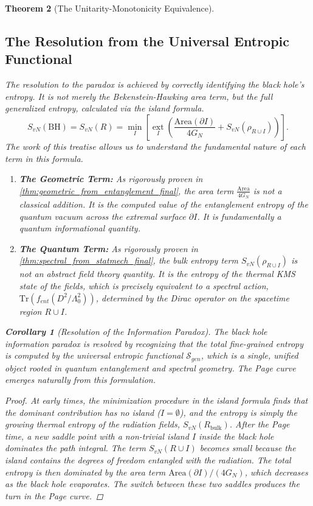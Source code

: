 \documentclass[11pt, letterpaper]{report}
\theoremstyle{plain} %
\newtheorem{theorem}{Theorem}[chapter]
\newtheorem{corollary}[theorem]{Corollary}
\theoremstyle{definition} %
\theoremstyle{remark} %
\begin{document}
\begin{theorem}[The Unitarity-Monotonicity Equivalence]
\subsection{The Resolution from the Universal Entropic Functional}
The resolution to the paradox is achieved by correctly identifying the black hole's entropy. It is not merely the Bekenstein-Hawking area term, but the full generalized entropy, calculated via the island formula.
\begin{equation}
    S_{vN}(\text{BH}) = S_{vN}(R) = \min_{I} \left[ \operatorname*{ext}_{I} \left( \frac{\text{Area}(\partial I)}{4G_N} + S_{vN}(\rho_{R \cup I}) \right) \right].
\end{equation}
The work of this treatise allows us to understand the fundamental nature of each term in this formula.
\begin{enumerate}
    \item \textbf{The Geometric Term:} As rigorously proven in \cref{thm:geometric_from_entanglement_final}, the area term $\frac{\text{Area}}{4G_N}$ is not a classical addition. It is the computed value of the entanglement entropy of the quantum vacuum across the extremal surface $\partial I$. It is fundamentally a quantum informational quantity.

    \item \textbf{The Quantum Term:} As rigorously proven in \cref{thm:spectral_from_statmech_final}, the bulk entropy term $S_{vN}(\rho_{R \cup I})$ is not an abstract field theory quantity. It is the entropy of the thermal KMS state of the fields, which is precisely equivalent to a spectral action, $\text{Tr}(f_{ent}(D^2/\Lambda_0^2))$, determined by the Dirac operator on the spacetime region $R \cup I$.
\end{enumerate}

\begin{corollary}[Resolution of the Information Paradox]
The black hole information paradox is resolved by recognizing that the total fine-grained entropy is computed by the universal entropic functional $\mathcal{S}_{gen}$, which is a single, unified object rooted in quantum entanglement and spectral geometry. The Page curve emerges naturally from this formulation.
\end{corollary}
\begin{proof}
At early times, the minimization procedure in the island formula finds that the dominant contribution has no island ($I=\emptyset$), and the entropy is simply the growing thermal entropy of the radiation fields, $S_{vN}(R_{\text{bulk}})$. After the Page time, a new saddle point with a non-trivial island $I$ inside the black hole dominates the path integral. The term $S_{vN}(R \cup I)$ becomes small because the island contains the degrees of freedom entangled with the radiation. The total entropy is then dominated by the area term $\text{Area}(\partial I)/(4G_N)$, which decreases as the black hole evaporates. The switch between these two saddles produces the turn in the Page curve.


\end{proof}
\end{theorem}
\end{document}
